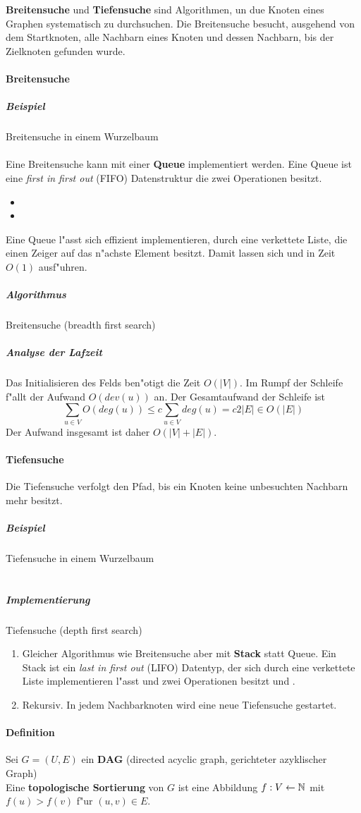 \textbf{Breitensuche} und \textbf{Tiefensuche} sind Algorithmen, un due Knoten eines Graphen systematisch zu
durchsuchen. Die Breitensuche besucht, ausgehend von dem Startknoten, alle Nachbarn eines Knoten und dessen
Nachbarn, bis der Zielknoten gefunden wurde.

\paragraph{Breitensuche}
\subparagraph{Beispiel} Breitensuche in einem Wurzelbaum\\
\\ %
Eine Breitensuche kann mit einer \textbf{Queue} implementiert werden. Eine Queue ist eine
\textit{first in first out} (FIFO) Datenstruktur die zwei Operationen besitzt.
\begin{itemize}
    \item {}
    \item {}
\end{itemize}
Eine Queue l"asst sich effizient implementieren, durch eine verkettete Liste, die einen Zeiger auf das n"achste
Element besitzt. Damit lassen sich  und  in Zeit $O(1)$ ausf"uhren.

\subparagraph{Algorithmus} Breitensuche (breadth first search)

\subparagraph{Analyse der Lafzeit} \parskp
Das Initialisieren des Felds  ben"otigt die Zeit $O(|V|)$. Im Rumpf der  Schleife
f"allt der Aufwand $O(dev(u))$ an. Der Gesamtaufwand der  Schleife ist
\[
    \sum_{u\in V}O(deg(u))\le c\sum_{u\in V}deg(u)=c2|E|\in O(|E|)    
\]
Der Aufwand insgesamt ist daher $O(|V|+|E|)$.

\paragraph{Tiefensuche}
Die Tiefensuche verfolgt den Pfad, bis ein Knoten keine unbesuchten Nachbarn mehr besitzt.

\subparagraph{Beispiel} Tiefensuche in einem Wurzelbaum\\
\\  %

\subparagraph{Implementierung} Tiefensuche (depth first search)
\begin{enumerate}
    \item Gleicher Algorithmus wie Breitensuche aber mit \textbf{Stack} statt Queue. Ein Stack ist ein
          \textit{last in first out} (LIFO) Datentyp, der sich durch eine verkettete Liste implementieren
          l"asst und zwei Operationen besitzt  und .
    \item Rekursiv. In jedem Nachbarknoten wird eine neue Tiefensuche gestartet.
\end{enumerate}

\paragraph{Definition} Sei $G=(U,E)$ ein \textbf{DAG} (directed acyclic graph, gerichteter azyklischer Graph)\\
Eine \textbf{topologische Sortierung} von $G$ ist eine Abbildung $f:V\leftarrow\mathbb{N}$ mit $f(u)>f(v)$ f"ur $(u,v)\in E$.
